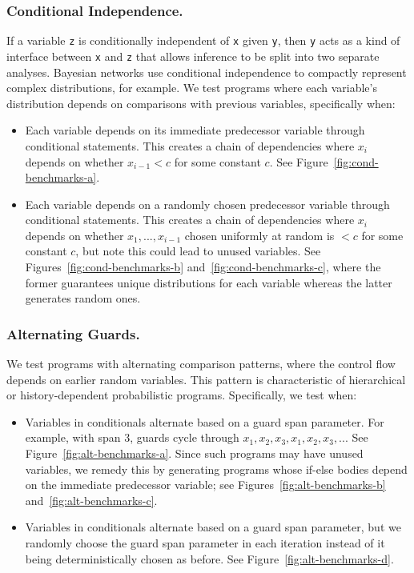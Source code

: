 \subsubsection{Conditional Independence.} 
If a variable \texttt{z} is conditionally independent of \texttt{x} given \texttt{y}, then \texttt{y} acts as a kind of interface between \texttt{x} and \texttt{z} that allows inference to be split into two separate analyses. Bayesian networks use conditional independence to compactly represent complex distributions, for example. We test programs where each variable's distribution depends on comparisons with previous variables, specifically when:

\begin{itemize}
\item Each variable depends on its immediate predecessor variable through conditional statements. This creates a chain of dependencies where $x_i$ depends on whether $x_{i-1} < c$ for some constant $c$. See Figure~\ref{fig:cond-benchmarks-a}.
\item Each variable depends on a randomly chosen predecessor variable through conditional statements. This creates a chain of dependencies where $x_i$ depends on whether $x_1, ..., x_{i-1}$ chosen uniformly at random is $< c$ for some constant $c$, but note this could lead to unused variables. See Figures~\ref{fig:cond-benchmarks-b} and~\ref{fig:cond-benchmarks-c}, where the former guarantees unique distributions for each variable whereas the latter generates random ones.
\end{itemize}



\subsubsection{Alternating Guards.}
We test programs with alternating comparison patterns,
where the control flow depends on earlier random variables. This pattern is characteristic of hierarchical or history-dependent probabilistic programs. Specifically, we test when:

\begin{itemize}
\item Variables in conditionals alternate based on a guard span parameter. For example, with span 3, guards cycle through $x_1, x_2, x_3, x_1, x_2, x_3, ...$ See Figure~\ref{fig:alt-benchmarks-a}. Since such programs may have unused variables, we remedy this by generating programs whose if-else bodies depend on the immediate predecessor variable; see Figures~\ref{fig:alt-benchmarks-b} and~\ref{fig:alt-benchmarks-c}.

\item Variables in conditionals alternate based on a guard span parameter, but we randomly choose the guard span parameter in each iteration instead of it being deterministically chosen as before. See Figure~\ref{fig:alt-benchmarks-d}.
\end{itemize}

